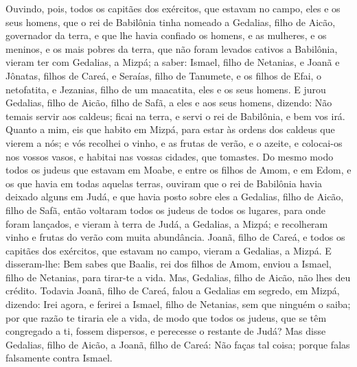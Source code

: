 Ouvindo, pois, todos os capitães dos exércitos, que estavam no
campo, eles e os seus homens, que o rei de Babilônia tinha nomeado a
Gedalias, filho de Aicão, governador da terra, e que lhe havia
confiado os homens, e as mulheres, e os meninos, e os mais pobres da
terra, que não foram levados cativos a Babilônia, vieram ter com
Gedalias, a Mizpá; a saber: Ismael, filho de Netanias, e Joanã e
Jônatas, filhos de Careá, e Seraías, filho de Tanumete, e os filhos
de Efai, o netofatita, e Jezanias, filho de um maacatita, eles e os
seus homens. E jurou Gedalias, filho de Aicão, filho de Safã, a
eles e aos seus homens, dizendo: Não temais servir aos caldeus;
ficai na terra, e servi o rei de Babilônia, e bem vos irá.
Quanto a mim, eis que habito em Mizpá, para estar às ordens
dos caldeus que vierem a nós; e vós recolhei o vinho, e as frutas de
verão, e o azeite, e colocai-os nos vossos vasos, e habitai nas
vossas cidades, que tomastes. Do mesmo modo todos os judeus
que estavam em Moabe, e entre os filhos de Amom, e em Edom, e os que
havia em todas aquelas terras, ouviram que o rei de Babilônia havia
deixado alguns em Judá, e que havia posto sobre eles a Gedalias,
filho de Aicão, filho de Safã, então voltaram todos os judeus
de todos os lugares, para onde foram lançados, e vieram à terra de
Judá, a Gedalias, a Mizpá; e recolheram vinho e frutas do verão com
muita abundância. Joanã, filho de Careá, e todos os capitães
dos exércitos, que estavam no campo, vieram a Gedalias, a Mizpá.
E disseram-lhe: Bem sabes que Baalis, rei dos filhos de Amom,
enviou a Ismael, filho de Netanias, para tirar-te a vida. Mas,
Gedalias, filho de Aicão, não lhes deu crédito. Todavia
Joanã, filho de Careá, falou a Gedalias em segredo, em Mizpá,
dizendo: Irei agora, e ferirei a Ismael, filho de Netanias, sem que
ninguém o saiba; por que razão te tiraria ele a vida, de modo que
todos os judeus, que se têm congregado a ti, fossem dispersos, e
perecesse o restante de Judá? Mas disse Gedalias, filho de
Aicão, a Joanã, filho de Careá: Não faças tal coisa; porque falas
falsamente contra Ismael.

\medskip

